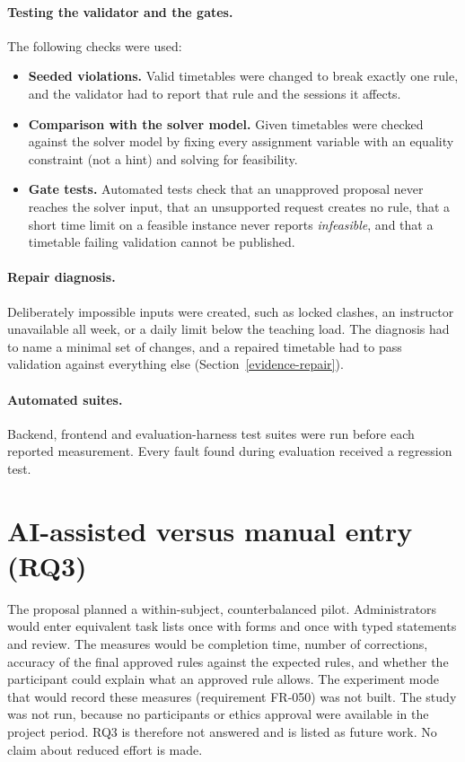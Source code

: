 \paragraph{Testing the validator and the gates.} The following checks were used:
\begin{itemize}
\item \textbf{Seeded violations.} Valid timetables were changed to break exactly one rule, and the validator had to report that rule and the sessions it affects.
\item \textbf{Comparison with the solver model.} Given timetables were checked against the solver model by fixing every assignment variable with an equality constraint (not a hint) and solving for feasibility.
\item \textbf{Gate tests.} Automated tests check that an unapproved proposal never reaches the solver input, that an unsupported request creates no rule, that a short time limit on a feasible instance never reports \emph{infeasible}, and that a timetable failing validation cannot be published.
\end{itemize}

\paragraph{Repair diagnosis.} Deliberately impossible inputs were created, such as locked clashes, an instructor unavailable all week, or a daily limit below the teaching load. The diagnosis had to name a minimal set of changes, and a repaired timetable had to pass validation against everything else (Section~\ref{evidence-repair}).

\paragraph{Automated suites.} Backend, frontend and evaluation-harness test suites were run before each reported measurement. Every fault found during evaluation received a regression test.

\section{AI-assisted versus manual entry (RQ3)}\label{meth-rq3}

The proposal planned a within-subject, counterbalanced pilot. Administrators would enter equivalent task lists once with forms and once with typed statements and review. The measures would be completion time, number of corrections, accuracy of the final approved rules against the expected rules, and whether the participant could explain what an approved rule allows. The experiment mode that would record these measures (requirement FR-050) was not built. The study was not run, because no participants or ethics approval were available in the project period. RQ3 is therefore not answered and is listed as future work. No claim about reduced effort is made.

